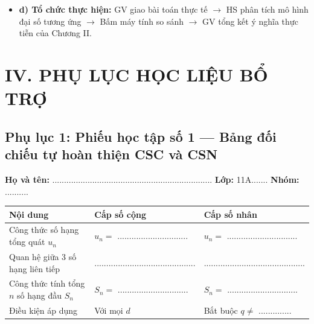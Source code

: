 \documentclass[12pt, a4paper]{article}
\begin{document}
\begin{itemize}
\begin{itemize}
        Anh Bình có: $100 + 15 \cdot 12 = 280$ triệu đồng.\\
        Anh Cường có: $100 \cdot (1{,}08)^{15} \approx 317{,}22$ triệu đồng $\implies$ Anh Cường vượt trội hơn anh Bình tới $37{,}22$ triệu đồng!
    \end{itemize}
    $\implies$ \textbf{Bài học kinh tế:} Cấp số cộng có ưu thế trong ngắn hạn, nhưng cấp số nhân (lãi kép) sẽ bùng nổ vượt trội hoàn toàn trong dài hạn.
    \item \textbf{d) Tổ chức thực hiện:} GV giao bài toán thực tế $\to$ HS phân tích mô hình đại số tương ứng $\to$ Bấm máy tính so sánh $\to$ GV tổng kết ý nghĩa thực tiễn của Chương II.
\end{itemize}

\newpage

\section*{IV. PHỤ LỤC HỌC LIỆU BỔ TRỢ}

\subsection*{Phụ lục 1: Phiếu học tập số 1 --- Bảng đối chiếu tự hoàn thiện CSC và CSN}
\noindent\textbf{Họ và tên:} .................................................................... \textbf{Lớp:} 11A....... \textbf{Nhóm:} ..........

\begin{pedabox}
\begin{center}
\begin{tabularx}{0.95\linewidth}{|p{3.8cm}|X|X|}
\hline
\textbf{Nội dung} & \textbf{Cấp số cộng} & \textbf{Cấp số nhân} \\
\hline
Công thức số hạng tổng quát $u_n$ & $u_n = $ .............................. & $u_n = $ .............................. \\
\hline
Quan hệ giữa 3 số hạng liên tiếp & ........................................... & ........................................... \\
\hline
Công thức tính tổng $n$ số hạng đầu $S_n$ & $S_n = $ .............................. & $S_n = $ .............................. \\
\hline
Điều kiện áp dụng & Với mọi $d$ & Bắt buộc $q \neq $ .............. \\
\hline
\end{tabularx}
\end{center}
\end{pedabox}
\end{document}
